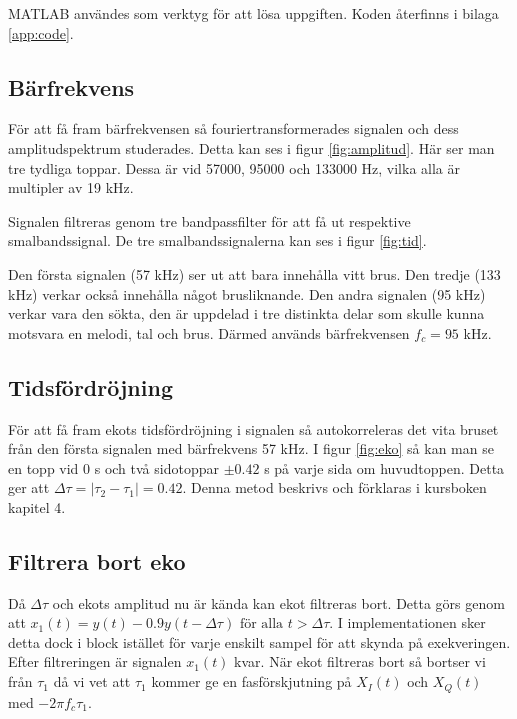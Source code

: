 \documentclass[10pt,twocolumn]{article}
\begin{document}
MATLAB användes som verktyg för att lösa uppgiften. Koden återfinns i bilaga \ref{app:code}.

\subsection{Bärfrekvens} \label{sec:carrier}
För att få fram bärfrekvensen så fouriertransformerades signalen och dess amplitudspektrum studerades. Detta kan ses i figur \ref{fig:amplitud}.
Här ser man tre tydliga toppar. Dessa är vid 57000, 95000 och 133000 Hz, vilka alla är multipler av 19 kHz.

Signalen filtreras genom tre bandpassfilter för att få ut respektive smalbandssignal. De tre smalbandssignalerna kan ses i figur \ref{fig:tid}.

Den första signalen (57 kHz) ser ut att bara innehålla vitt brus. Den tredje (133 kHz) verkar också innehålla något brusliknande. Den andra signalen (95 kHz) verkar vara den sökta, den är uppdelad i tre distinkta delar som skulle kunna motsvara en melodi, tal och brus. Därmed används bärfrekvensen $f_c = 95$ kHz.

\subsection{Tidsfördröjning}
För att få fram ekots tidsfördröjning i signalen så autokorreleras det vita bruset från den första signalen med bärfrekvens 57 kHz. I figur \ref{fig:eko} så kan man se en topp vid 0 s och två sidotoppar $\pm 0.42 $ s på varje sida om huvudtoppen. Detta ger att $\Delta \tau=|\tau_{2}-\tau_{1}|=0.42$. Denna metod beskrivs och förklaras i kursboken kapitel 4.

\subsection{Filtrera bort eko}
Då $\Delta \tau$ och ekots amplitud nu är kända kan ekot filtreras bort. Detta görs genom att $x_1(t)=y(t)-0.9y(t-\Delta \tau) \text{ för alla } t>\Delta \tau$. I implementationen sker detta dock i block istället för varje enskilt sampel för att skynda på exekveringen. Efter filtreringen är signalen $x_1(t)$  kvar. När ekot filtreras bort så bortser vi från $\tau_1$ då vi vet att $\tau_1$ kommer ge en fasförskjutning på $X_I(t)$ och $X_Q(t)$ med $-2\pi f_c\tau_1$.
\end{document}
